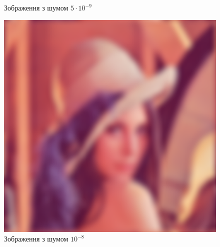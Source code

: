 \documentclass{diploma}
\begin{document}
\begin{figure}[htb]
          \caption{Зображення з шумом $5\cdot10^{-9}$}\label{fig:Lenna-b5e-9}
        \endminipage\hfill
          \includegraphics[width=\linewidth]{Lenna-b1e-8.png}
          \caption{Зображення з шумом $10^{-8}$}\label{fig:Lenna-b1e-8}
        \endminipage\hfill


\end{figure}
\end{document}
